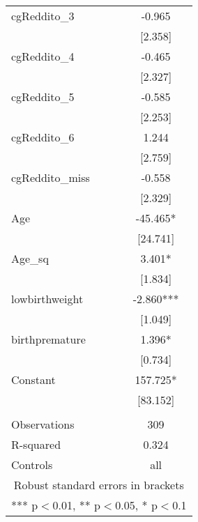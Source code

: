 \documentclass[]{article}
\begin{document}
\begin{tabular}{lc}
cgReddito\_3 & -0.965 \\
 & [2.358] \\
cgReddito\_4 & -0.465 \\
 & [2.327] \\
cgReddito\_5 & -0.585 \\
 & [2.253] \\
cgReddito\_6 & 1.244 \\
 & [2.759] \\
cgReddito\_miss & -0.558 \\
 & [2.329] \\
Age & -45.465* \\
 & [24.741] \\
Age\_sq & 3.401* \\
 & [1.834] \\
lowbirthweight & -2.860*** \\
 & [1.049] \\
birthpremature & 1.396* \\
 & [0.734] \\
Constant & 157.725* \\
 & [83.152] \\
 &  \\
Observations & 309 \\
R-squared & 0.324 \\
 Controls & all \\ \hline
\multicolumn{2}{c}{ Robust standard errors in brackets} \\
\multicolumn{2}{c}{ *** p$<$0.01, ** p$<$0.05, * p$<$0.1} \\
\end{tabular}
\end{document}
